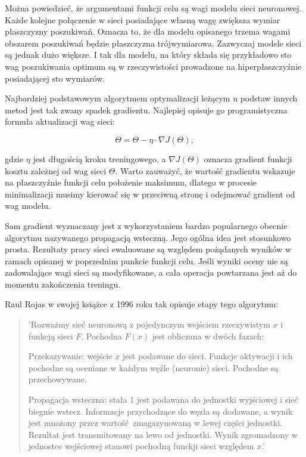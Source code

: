 \begin{enumerate}
    Można powiedzieć, że argumentami funkcji celu są wagi modelu sieci neuronowej.
    Każde kolejne połączenie w sieci posiadające własną wagę zwiększa wymiar
    płaszczyzny poszukiwań. Oznacza to, że dla modelu opisanego trzema wagami
    obszarem poszukiwań będzie płaszczyzna trójwymiarowa. Zazwyczaj modele sieci
    są jednak dużo większe. I tak dla modelu, na który składa się przykładowo sto
    wag poszukiwania optimum są w rzeczywistości prowadzone na hiperpłaszczyźnie
    posiadającej sto wymiarów.

    Najbardziej podstawowym algorytmem optymalizacji leżącym u podstaw innych
    metod jest tak zwany spadek gradientu. Najlepiej opisuje go programistyczna
    formuła aktualizacji wag sieci:

    \[\Theta = \Theta - \eta \cdot \nabla J(\Theta),\]

    gdzie $\eta$ jest długością kroku treningowego, a $\nabla J(\Theta)$ oznacza
    gradient funkcji kosztu zależnej od wag sieci $\Theta$. Warto zauważyć, że
    wartość gradientu wskazuje na płaszczyźnie funkcji celu położenie maksimum,
    dlatego w procesie minimalizacji musimy kierować się w przeciwną stronę i odejmować
    gradient od wag modelu.

    Sam gradient wyznaczany jest z wykorzystaniem bardzo popularnego obecnie
    algorytmu nazywanego propagacją wsteczną. Jego ogólna idea jest stosunkowo
    prosta. Rezultaty pracy sieci ewaluowane są względem pożądanych wyników w
    ramach opisanej w poprzednim punkcie funkcji celu. Jeśli wyniki oceny nie są
    zadowalające wagi sieci są modyfikowane, a cała operacja powtarzana jest aż
    do momentu zakończenia treningu.

    Raul Rojas w swojej książce \cite{systematic_introduction} z 1996 roku tak
    opisuje etapy tego algorytmu:

    \begin{quote}
      'Rozważmy sieć neuronową z pojedynczym wejściem rzeczywistym $x$ i funkcją
      sieci $F$. Pochodna $F(x)$ jest obliczana w dwóch fazach:

      Przekazywanie: wejście $x$ jest podawane do sieci. Funkcje aktywacji i ich pochodne są oceniane w każdym węźle (neuronie) sieci. Pochodne są przechowywane.

      Propagacja wsteczna: stała 1 jest podawana do jednostki wyjściowej i sieć biegnie wstecz. Informacje przychodzące do węzła są dodawane, a wynik jest mnożony przez wartość zmagazynowaną w lewej części jednostki. Rezultat jest transmitowany na lewo od jednostki. Wynik zgromadzony w jednostce wejściowej stanowi pochodną funckji sieci względem $x$.'
    \end{quote}


\end{enumerate}
